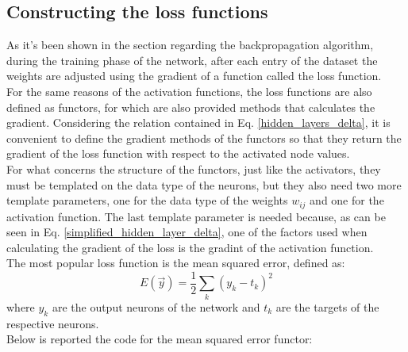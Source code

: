 \documentclass[12pt]{article}
\begin{document}
\subsection{Constructing the loss functions}
As it's been shown in the section regarding the backpropagation algorithm, during the training phase of the
network, after each entry of the dataset the weights are adjusted using the gradient of a function called 
the loss function. \\
For the same reasons of the activation functions, the loss functions are also defined as functors, for which 
are also provided methods that calculates the gradient. Considering the relation contained in Eq. 
\ref{hidden_layers_delta}, it is convenient to define the gradient methods of the functors so that they 
return the gradient of the loss function with respect to the activated node values. \\
For what concerns the structure of the functors, just like the activators, they must be templated on the 
data type of the neurons, but they also need two more template parameters, one for the data type of the 
weights $w_{ij}$ and one for the activation function. The last template parameter is needed because, as 
can be seen in Eq. \ref{simplified_hidden_layer_delta}, one of the factors used when calculating the gradient
of the loss is the gradint of the activation function. \\
The most popular loss function is the mean squared error, defined as:
\begin{equation}
  E(\vec{y}) = \frac{1}{2}\sum_k (y_k - t_k)^2
\end{equation}
where $y_k$ are the output neurons of the network and $t_k$ are the targets of the respective neurons. \\
Below is reported the code for the mean squared error functor:
\end{document}
